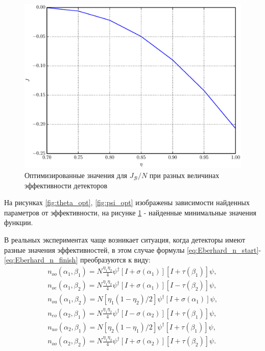 \documentclass[%
master,         %
subf,           %
href,           %
,times         %
]{disser}
\numberwithin{equation}{section}
\numberwithin{figure}{section}
\begin{document}
\begin{figure}[h]
\includegraphics[scale=0.7]{J.eps}
\caption{Оптимизированные значения для $J_{\mathcal{B}}/N$ при разных величинах эффективности детекторов}
\label{fig:J_opt}
\end{figure}

На рисунках \ref{fig:theta_opt}, \ref{fig:psi_opt} изображены зависимости найденных параметров от эффективности, на рисунке \ref{fig:J_opt} - найденные минимальные значения функции.

В реальных экспериментах чаще возникает ситуация, когда детекторы имеют разные значения эффективностей, в этом случае формулы \eqref{eq:Eberhard_n_start}-\eqref{eq:Eberhard_n_finish} преобразуются к виду:
\begin{eqnarray*}
n_{oo}(\alpha_1, \beta_1) = N\frac{\eta_1\eta_2}{4}\psi^\dagger[I + \sigma(\alpha_1)][I + \tau(\beta_1)]\psi,\\
n_{oe}(\alpha_1, \beta_2) = N\frac{\eta_1\eta_2}{4}\psi^\dagger[I + \sigma(\alpha_1)][I - \tau(\beta_2)]\psi,\\
n_{ou}(\alpha_1, \beta_2) = N[\eta_1(1 - \eta_2)/2]\psi^\dagger[I + \sigma(\alpha_1)]\psi,\\
n_{eo}(\alpha_2, \beta_1) = N\frac{\eta_1\eta_2}{4}\psi^\dagger[I - \sigma(\alpha_2)][I + \tau(\beta_1)]\psi,\\
n_{uo}(\alpha_2, \beta_1) = N[\eta_2(1 - \eta_1)/2]\psi^\dagger[I + \tau(\beta_1)]\psi,\\
n_{oo}(\alpha_2, \beta_2) = N\frac{\eta_1\eta_2}{4}\psi^\dagger[I + \sigma(\alpha_2)][I + \tau(\beta_2)]\psi.
\end{eqnarray*}
\end{document}
